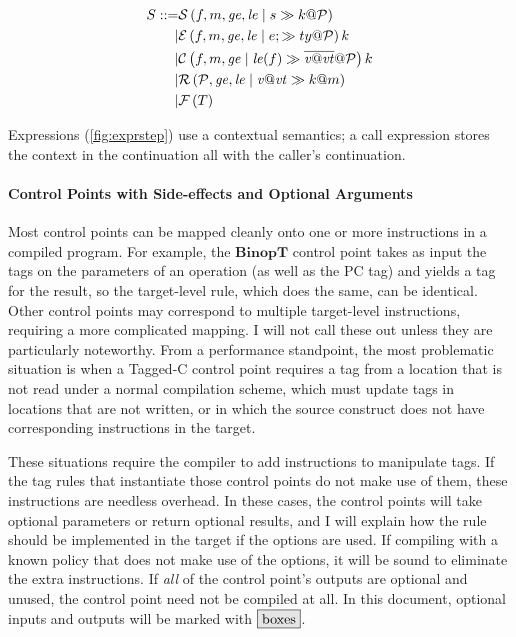 \documentclass[acmsmall,review,anonymous]{acmart}\settopmatter{printfolios=true,printccs=false,printacmref=false}
\begin{document}
\[\begin{aligned}
S ::= & \mathcal{S}\left(f,m,\mathit{ge},\mathit{le} \mid s \gg k @ \mathcal{P}\right) \\
| & \mathcal{E}\left(f,m,\mathit{ge},\mathit{le} \mid e; \gg ty @ \mathcal{P}\right){k} \\
| & \mathcal{C}\left(f,m,\mathit{ge} \mid \mathit{le}(f) \gg \overline{\mathit{v} @ \mathit{vt}} @ \mathcal{P}\right){k} \\
| & \mathcal{R}\left(\mathcal{P},\mathit{ge},\mathit{le} \mid \mathit{v} @ \mathit{vt} \gg k @ m\right) \\
| & \mathcal{F}\left(T\right) \\
\end{aligned}\]

Expressions (\cref{fig:exprstep}) use a contextual semantics; a call expression stores the
context in the continuation all with the caller's continuation.

\paragraph*{Control Points with Side-effects and Optional Arguments}

Most control points can be mapped cleanly onto one or more instructions in a compiled
program. For example, the \(\mathbf{BinopT}\) control point takes as input the tags on the parameters
of an operation (as well as the PC tag) and yields a tag for the result, so the target-level
rule, which does the same, can be identical. Other control points may correspond to multiple
target-level instructions, requiring a more complicated mapping. I will not call these out
unless they are particularly noteworthy. From a performance standpoint, the most problematic
situation is when a Tagged-C control point requires a tag from a location that is not read under
a normal compilation scheme, which must update tags in locations that are not written, or in which
the source construct does not have corresponding instructions in the target.

These situations require the compiler to add instructions to manipulate tags.
If the tag rules that instantiate those control points do not make use of them, these instructions
are needless overhead. In these cases, the control points will take optional parameters or return
optional results, and I will explain how the rule should be implemented in the target if the
options are used. If compiling with a known policy that does not make use of the options, it will
be sound to eliminate the extra instructions. If {\it all} of the control point's outputs are
optional and unused, the control point need not be compiled at all. In this document, optional inputs
and outputs will be marked with \(\optional{boxes}\).
\end{document}
